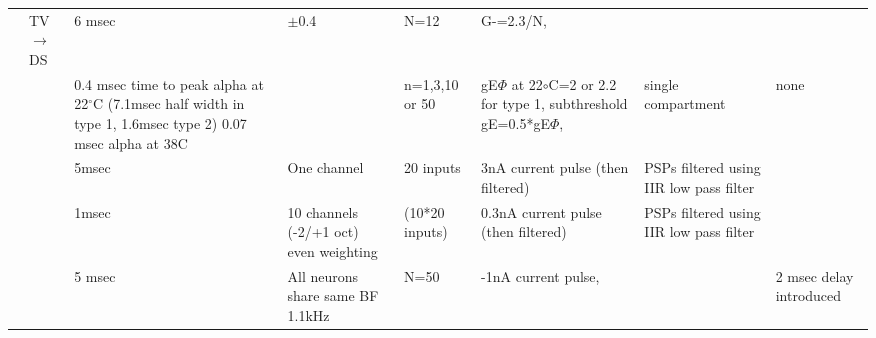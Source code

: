 \begin{longtable}{cXXXXXXX}
                                                 &  TV\ensuremath{\rightarrow}DS   &                                                       6 msec                                                       &                         $\pm$0.4                          &                   N=12                    &                                    G-=2.3/N,                                    &                                           & \\ 


           \citep{RothmanManis:2003c}            &                                 & {0.4 msec time to peak alpha at 22$^\circ$C (7.1msec half width in type 1, 1.6msec type 2) 0.07 msec alpha at 38C} &                                                           &              n=1,3,10 or 50               & {gE$\Phi $ at 22$\circ$C=2 or 2.2 for type 1, subthreshold gE=0.5*gE$\Phi $,  } &           {single compartment }           & none\\ 

       \citep{PressnitzerMeddisEtAl:2001}        &                                 &                                                      {5msec}                                                       &                       {One channel}                       &                 20 inputs                 &                       {3nA current pulse (then filtered)}                       & {PSPs filtered using IIR low pass filter} & \\ 
                                                 &                                 &                                                      {1msec}                                                       &         {10 channels (-2/+1 oct) even weighting }         &              (10*20 inputs)               &                      {0.3nA current pulse (then filtered)}                      & {PSPs filtered using IIR low pass filter} & \\ 
                                                 &                                 &                                                       5 msec                                                       &             All neurons share same BF 1.1kHz              &                   N=50                    &                              {}-1nA current pulse,                              &                                           & 2 msec delay introduced \\ \midrule


\end{longtable}
